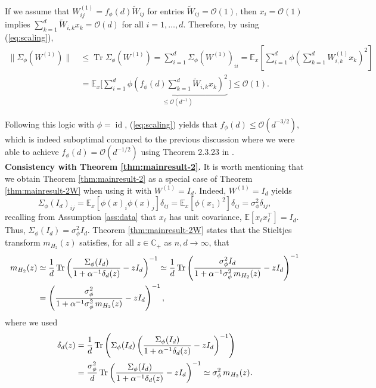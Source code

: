 \documentclass{article}
\begin{document}
If we assume that $W^{(1)}_{ij}=f_\phi(d)\tilde{W}_{ij}$ for entries $\tilde{W}_{ij}=\mathcal{O}(1)$, then $x_i=\mathcal{O}(1)$ implies $\sum_{k=1}^d\tilde{W}_{i,k}x_k=\mathcal{O}(d)$ for all $i=1,\dots,d$. Therefore, by using (\ref{eq:scaling}),
\begin{align}
\|\Sigma_\phi(W^{(1)})\|\,&\leq\operatorname{Tr}\Sigma_\phi(W^{(1)})=\sum_{i=1}^d\Sigma_\phi(W^{(1)})_{ii} = \mathbb{E}_x\left[\sum_{i=1}^d\phi\left(\sum_{k=1}^dW^{(1)}_{i,k}x_k\right)^2\right]
\\ &= \mathbb{E}_x\Biggl[\sum_{i=1}^d\underbrace{\phi\left(f_\phi(d)\sum_{k=1}^d\tilde{W}_{i,k}x_k\right)^2}_{\leq\mathcal{O}(d^{-1})}\,\Biggr]\leq\mathcal{O}(1).
\end{align}
\par
Following this logic with $\phi=\operatorname{id}$, (\ref{eq:scaling}) yields that $f_\phi(d)\leq\mathcal{O}(d^{-3/2})$, which is indeed suboptimal compared to the previous discussion where we were able to achieve $f_\phi(d)=\mathcal{O}(d^{-1/2})$ using Theorem 2.3.23 in \cite{tao}.
\bigskip
\bigskip
\\
\textbf{Consistency with Theorem \ref{thm:mainresult-2}.} It is worth mentioning that we obtain Theorem \ref{thm:mainresult-2} as a special case of Theorem \ref{thm:mainresult-2W} when using it with $W^{(1)}=I_d$. Indeed, $W^{(1)}=I_d$ yields 
\begin{equation}
\Sigma_\phi(I_d)_{ij}=\mathbb{E}_x[\phi(x)_i\phi(x)_j]\delta_{ij}=\mathbb{E}_x[\phi(x_1)^2]\delta_{ij}=\sigma_\phi^2\delta_{ij},
\end{equation}
recalling from Assumption \ref{ass:data} that $x_\ell$ has unit covariance, $\mathbb{E}[x_\ell x_\ell^\top]=I_d$. Thus, $\Sigma_\phi(I_d)=\sigma_\phi^2 I_d$. Theorem \ref{thm:mainresult-2W} states that the Stieltjes transform $m_{H_2}(z)$ satisfies, for all $z\in\mathbb{C}_+$ as $n,d\to\infty$, that
\begin{align}
m_{H_2}(z) &\simeq \frac{1}{d}\operatorname{Tr}\left(\frac{\Sigma_\phi(I_d)}{1+\alpha^{-1}\delta_d(z)}-zI_d\right)^{-1}\simeq\frac{1}{d}\operatorname{Tr}\left(\frac{\sigma_\phi^2I_d}{1+\alpha^{-1}\sigma_\phi^2\,m_{H_2}(z)}-zI_d\right)^{-1} \notag
\\&= \left(\frac{\sigma_\phi^2}{1+\alpha^{-1}\sigma_\phi^2\,m_{H_2}(z)}-zI_d\right)^{-1},
\end{align}
where we used
\begin{align}
\delta_d(z) &= \frac{1}{d}\operatorname{Tr}\left(\Sigma_\phi(I_d)\left(\frac{\Sigma_\phi(I_d)}{1+\alpha^{-1}\delta_d(z)}-zI_d\right)^{-1}\right) \notag
\\&= \frac{\sigma_\phi^2}{d}\operatorname{Tr}\left(\frac{\Sigma_\phi(I_d)}{1+\alpha^{-1}\delta_d(z)}-zI_d\right)^{-1}\simeq\sigma_\phi^2 \,m_{H_2}(z).
\end{align}
\end{document}
